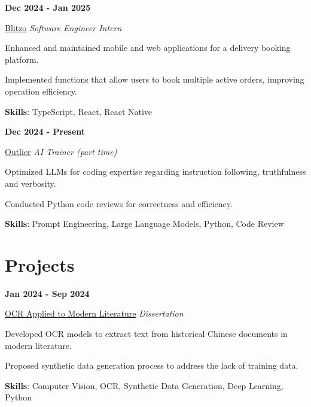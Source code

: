 \documentclass[9pt,a4paper]{article} %
\newenvironment{itemize-noindent}
{
\setlength{\leftmargini}{1em}
\begin{itemize}
\setlength{\itemsep}{0pt}
\setlength{\parskip}{0pt}
}
{\end{itemize}}
\begin{document}
\begin{multicols}{2}

\textbf{Dec 2024 - Jan 2025}

\href{https://blitzo.co.uk}{Blitzo} \hfill \textit{Software Engineer Intern}

\begin{itemize-noindent}
    \item Enhanced and maintained mobile and web applications for a delivery booking platform.
    \item Implemented functions that allow users to book multiple active orders, improving operation efficiency.
    \item \textbf{Skills}: TypeScript, React, React Native
\end{itemize-noindent}
\vspace{2mm}


\textbf{Dec 2024 - Present}

\href{https://outlier.ai}{Outlier} \hfill \textit{AI Trainer (part time)}

\begin{itemize-noindent}
    \item Optimized LLMs for coding expertise regarding instruction following, truthfulness and verbosity.
    \item Conducted Python code reviews for correctness and efficiency.
    \item \textbf{Skills}: Prompt Engineering, Large Language Models, Python, Code Review
\end{itemize-noindent}


\section{Projects}

\textbf{Jan 2024 - Sep 2024}

\href{https://github.com/Stx666Michael/MSc-Individual-Project}{OCR Applied to Modern Literature} \hfill \textit{Dissertation}

\begin{itemize-noindent}
    \item Developed OCR models to extract text from historical Chinese documents in modern literature.
    \item Proposed synthetic data generation process to address the lack of training data.
    \item \textbf{Skills}: Computer Vision, OCR, Synthetic Data Generation, Deep Learning, Python
\end{itemize-noindent}
\vspace{2mm}


\end{multicols}
\end{document}

